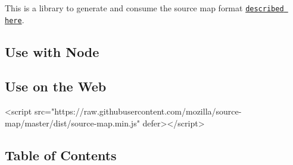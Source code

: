 \href{https://travis-ci.org/mozilla/source-map}{\tt }

\href{https://www.npmjs.com/package/source-map}{\tt }

This is a library to generate and consume the source map format \href{https://docs.google.com/document/d/1U1RGAehQwRypUTovF1KRlpiOFze0b-_2gc6fAH0KY0k/edit}{\tt described here}.

\subsection*{Use with Node}



\subsection*{Use on the Web}

\begin{DoxyVerb}<script src="https://raw.githubusercontent.com/mozilla/source-map/master/dist/source-map.min.js" defer></script>
\end{DoxyVerb}






\subsection*{Table of Contents}


